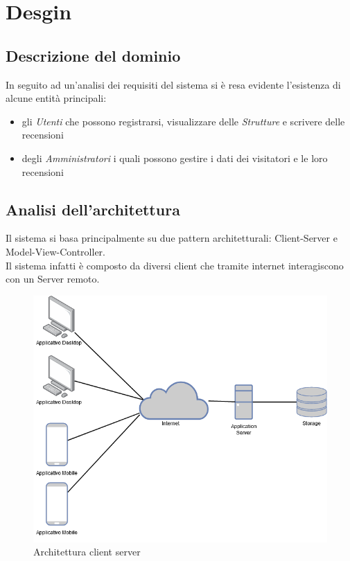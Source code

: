 %
%	 
%

\chapter{Desgin}
\section{Descrizione del dominio}
In seguito ad un'analisi dei requisiti del sistema si è resa evidente l'esistenza di alcune entità
principali:
\begin{itemize}
    \item gli \textit{Utenti} che possono registrarsi, visualizzare delle \textit{Strutture}
    e scrivere delle recensioni
    \item degli \textit{Amministratori} i quali possono gestire i dati dei visitatori e le loro recensioni
\end{itemize}
\section{Analisi dell'architettura}
Il sistema si basa principalmente su due pattern architetturali: Client-Server e Model-View-Controller.\\
Il sistema infatti è composto da diversi client che tramite internet interagiscono con un Server remoto.
\begin{center}
    \begin{figure}[H]
        \includegraphics[width=\textwidth]{Figures/Architettura client server.png}
        \caption{Architettura client server}
    \end{figure}
\end{center}
